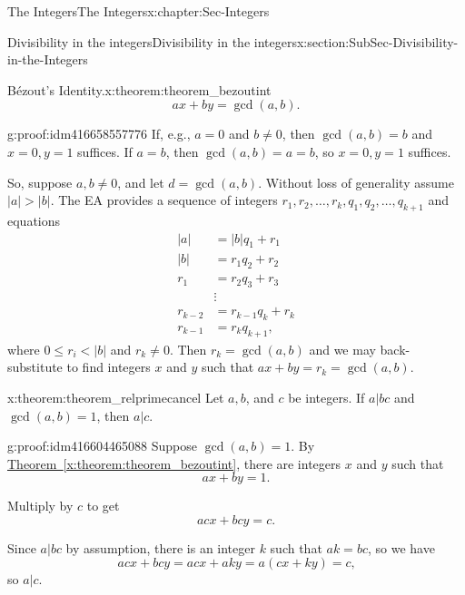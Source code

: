 \documentclass[oneside,10pt,]{book}
\numberwithin{equation}{section}
\renewcommand{\le}{\leqslant}
\newcommand{\lt}{<}
\newcommand{\amp}{&}
\begin{document}
\begin{chapterptx}{The Integers}{}{The Integers}{}{}{x:chapter:Sec-Integers}
\begin{sectionptx}{Divisibility in the integers}{}{Divisibility in the integers}{}{}{x:section:SubSec-Divisibility-in-the-Integers}
\begin{theorem}{Bézout's Identity.}{}{x:theorem:theorem_bezoutint}
\begin{equation*}
ax + by = \gcd(a,b)\text{.}
\end{equation*}
%
\end{theorem}
\begin{proofptx}{}{g:proof:idm416658557776}
If, e.g., \(a = 0\) and \(b\ne 0\), then \(\gcd(a,b) = b\) and \(x=0,y=1\) suffices. If \(a = b\), then \(\gcd(a,b) = a = b\), so \(x = 0, y = 1\) suffices.%
\par
So, suppose \(a,b\ne 0\), and let \(d = \gcd(a,b)\). Without loss of generality assume \(|a| > |b|\). The EA provides a sequence of integers \(r_1, r_2, \ldots,
r_k, q_1, q_2, \ldots, q_{k+1}\) and equations%
\begin{align*}
|a| \amp = |b| q_1 + r_1\\
|b| \amp = r_1 q_2 + r_2\\
r_1 \amp = r_2 q_3 + r_3\\
\amp \vdots\\
r_{k-2} \amp = r_{k-1} q_k + r_k\\
r_{k-1} \amp = r_k q_{k+1}\text{,}
\end{align*}
where \(0\le r_i \lt  |b|\) and \(r_k \ne 0\). Then \(r_k = \gcd(a,b)\) and we may back-substitute to find integers \(x\) and \(y\) such that \(ax + by = r_k = \gcd(a,b)\).%
\end{proofptx}
\begin{theorem}{}{}{x:theorem:theorem_relprimecancel}%
Let \(a, b\), and \(c\) be integers. If \(a|bc\) and \(\gcd(a,b) = 1\), then \(a|c\).%
\end{theorem}
\begin{proofptx}{}{g:proof:idm416604465088}
Suppose \(\gcd(a,b) = 1\). By \hyperref[x:theorem:theorem_bezoutint]{Theorem~\ref{x:theorem:theorem_bezoutint}}, there are integers \(x\) and \(y\) such that%
\begin{equation*}
ax+by = 1\text{.}
\end{equation*}
%
\par
Multiply by \(c\) to get%
\begin{equation*}
acx + bcy = c\text{.}
\end{equation*}
%
\par
Since \(a|bc\) by assumption, there is an integer \(k\) such that \(ak = bc\), so we have%
\begin{equation*}
acx + bcy = acx + aky = a(cx+ky) = c\text{,}
\end{equation*}
so \(a|c\).%
\end{proofptx}
\end{sectionptx}
%
%
\typeout{************************************************}

\end{chapterptx}
\end{document}
